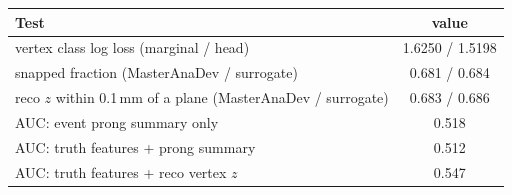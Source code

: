 \begin{tabular}{lc}
\toprule
Test & value \\
\midrule
vertex class log loss (marginal / head) & 1.6250 / 1.5198 \\
snapped fraction (MasterAnaDev / surrogate) & 0.681 / 0.684 \\
reco $z$ within 0.1\,mm of a plane (MasterAnaDev / surrogate) & 0.683 / 0.686 \\
\midrule
AUC: event prong summary only & 0.518 \\
AUC: truth features + prong summary & 0.512 \\
AUC: truth features + reco vertex $z$ & 0.547 \\
\bottomrule
\end{tabular}
